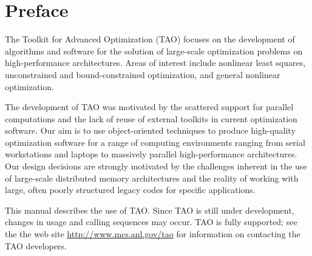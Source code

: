 
\section*{Preface}

The Toolkit for Advanced Optimization (TAO) focuses on the development
of algorithms and software for the solution of large-scale
optimization problems on high-performance architectures.  Areas of
interest include nonlinear least squares, unconstrained and
bound-constrained optimization, and general nonlinear optimization.

The development of TAO was motivated by the scattered support for
parallel computations and the lack of reuse of external toolkits in
current optimization software.  Our aim is to use object-oriented
techniques to produce high-quality optimization software for a range
of computing environments ranging from serial workstations and laptops
to massively parallel high-performance architectures.  Our design
decisions are strongly motivated by the challenges inherent in the use
of large-scale distributed memory architectures and the reality of
working with large, often poorly structured legacy codes for specific
applications.

This manual describes the use of TAO.
Since TAO is still under development, changes in usage and
calling sequences may occur.  TAO is fully supported; see the
the web site \url{http://www.mcs.anl.gov/tao} for information on
contacting the TAO developers.



